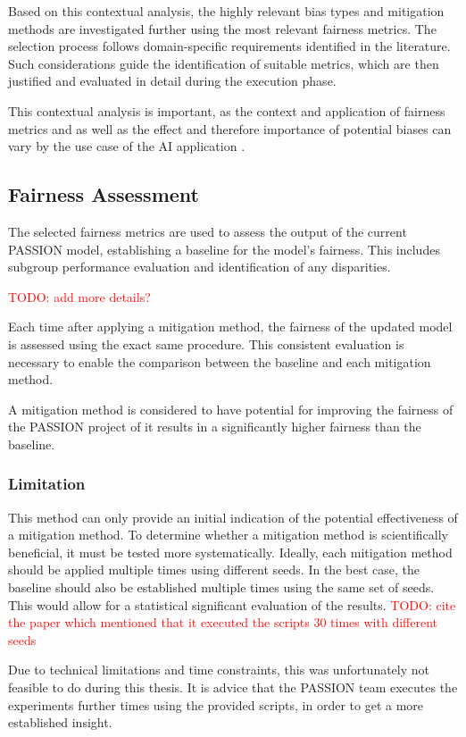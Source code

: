 \documentclass[12pt, a4paper, oneside]{book}   	%
\renewcommand{\todo}[1]{\textcolor{red}{TODO: #1}}
\begin{document}
		Based on this contextual analysis, the highly relevant bias types and mitigation methods are investigated further using the most relevant fairness metrics. The selection process follows domain-specific requirements identified in the literature. Such considerations guide the identification of suitable metrics, which are then justified and evaluated in detail during the execution phase.
		
		This contextual analysis is important, as the context and application of fairness metrics and as well as the effect and therefore importance of potential biases can vary by the use case of the \gls{AI} application \autocites{Mehrabi_2021}{Barr_2025}.
		
				
		\subsection{Fairness Assessment}
		The selected fairness metrics are used to assess the output of the current PASSION model, establishing a baseline for the model's fairness. This includes subgroup performance evaluation and identification of any disparities.
		
		\todo{add more details?}
		
		Each time after applying a mitigation method, the fairness of the updated model is assessed using the exact same procedure. This consistent evaluation is necessary to enable the comparison between the baseline and each mitigation method.
		
		A mitigation method is considered to have potential for improving the fairness of the PASSION project of it results in a significantly higher fairness than the baseline.
		
		\subsubsection{Limitation}
			This method can only provide an initial indication of the potential effectiveness of a mitigation method. To determine whether a mitigation method is scientifically beneficial, it must be tested more systematically. Ideally, each mitigation method should be applied multiple times using different seeds. In the best case, the baseline should also be established multiple times using the same set of seeds. This would allow for a statistical significant evaluation of the results. \todo{cite the paper which mentioned that it executed the scripts 30 times with different seeds}
			
			Due to technical limitations and time constraints, this was unfortunately not feasible to do during this thesis. It is advice that the PASSION team executes the experiments further times using the provided scripts, in order to get a more established insight.
\end{document}
